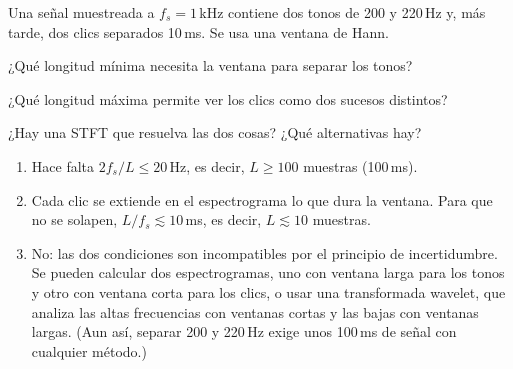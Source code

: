 \documentclass[11pt,a4paper]{scrartcl}
\begin{document}
\begin{ejercicio}
  Una señal muestreada a $f_s=1$\,kHz contiene dos tonos de 200 y 220\,Hz y, más tarde, dos clics separados 10\,ms. Se usa una ventana de Hann.
  \begin{incisos}[1]
    \item ¿Qué longitud mínima necesita la ventana para separar los tonos?
    \item ¿Qué longitud máxima permite ver los clics como dos sucesos distintos?
    \item ¿Hay una STFT que resuelva las dos cosas? ¿Qué alternativas hay?
  \end{incisos}
\end{ejercicio}
\begin{solucion}
  \begin{enumerate}[label=\alph*)]
    \item Hace falta $2f_s/L\le20$\,Hz, es decir, $L\ge100$ muestras (100\,ms).
    \item Cada clic se extiende en el espectrograma lo que dura la ventana. Para que no se solapen, $L/f_s\lesssim10$\,ms, es decir, $L\lesssim10$ muestras.
    \item No: las dos condiciones son incompatibles por el principio de incertidumbre. Se pueden calcular dos espectrogramas, uno con ventana larga para los tonos y otro con ventana corta para los clics, o usar una transformada wavelet, que analiza las altas frecuencias con ventanas cortas y las bajas con ventanas largas. (Aun así, separar 200 y 220\,Hz exige unos 100\,ms de señal con cualquier método.)
  \end{enumerate}
\end{solucion}
\end{document}
